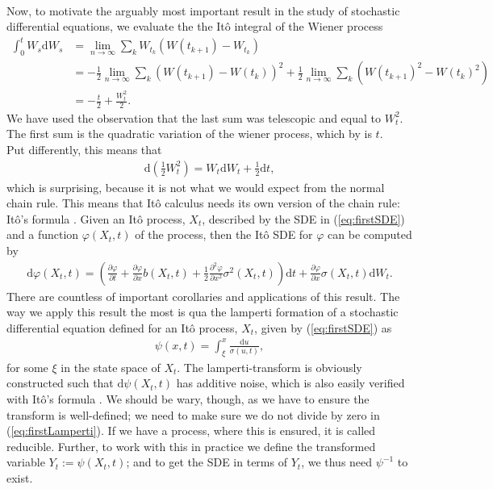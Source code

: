 \\
Now, to motivate the arguably most important result in the study of stochastic differential equations, we evaluate the the Itô integral of the Wiener process
\begin{align}
    \int_0^t W_s \mathrm{d}W_s & = \lim_{n \to \infty}\sum_k W_{t_k}\left(W(t_{k + 1}) - W_{t_k}\right) \nonumber \\ 
    & = - \frac{1}{2}\lim_{n \to \infty}\sum_k \left(W(t_{k + 1}) - W(t_{k})\right)^2  + \frac{1}{2}\lim_{n \to \infty}\sum_k\left(W(t_{k + 1})^2 - W(t_{k})^2\right) \nonumber \\
    & = -\frac{t}{2} + \frac{W_t^2}{2}.
\end{align}
We have used the observation that the last sum was telescopic and equal to $W_t^2$. The first sum is the quadratic variation of the wiener process, which by \cite[theorem 11.34]{Hansen2022} is $t$.\\ Put differently, this means that
\begin{align}
    \mathrm{d}\left(\frac{1}{2}W_t^2\right) = W_t\mathrm{d}W_t + \frac{1}{2}\mathrm{d}t,
\end{align}
which is surprising, because it is not what we would expect from the normal chain rule. This means that Itô calculus needs its own version of the chain rule: Itô's formula \cite[Theorem 4.2]{Srkk2019}.  Given an Itô process, $X_t$, described by the SDE in (\ref{eq:firstSDE}) and a function $\varphi(X_t, t)$ of the process, then the Itô SDE for $\varphi$ can be computed by
\begin{align}
    \mathrm{d}\varphi(X_t, t) = \left(\frac{\partial \varphi}{\partial t} + \frac{\partial\varphi}{\partial x}b(X_t, t) + \frac{1}{2} \frac{\partial^2 \varphi}{\partial x^2}\sigma^2(X_t, t) \right)\mathrm{d}t + \frac{\partial\varphi}{\partial x}\sigma(X_t, t) \mathrm{d}W_t.
\end{align}
There are countless of important corollaries and applications of this result. The way we apply this result the most is qua the lamperti formation of a stochastic differential equation defined for an Itô process, $X_t$, given by (\ref{eq:firstSDE}) as
\begin{align}
    \psi(x, t) = \int_{\xi}^x \frac{\mathrm{d}u}{\sigma(u, t)}, \label{eq:firstLamperti}
\end{align}
for some $\xi$ in the state space of $X_t$. The lamperti-transform is obviously constructed such that $\mathrm{d}\psi(X_t, t)$ has additive noise, which is also easily verified with Itô's formula \cite[equation (7.5)]{Srkk2019}. We should be wary, though, as we have to ensure the transform is well-defined; we need to make sure we do not divide by zero in (\ref{eq:firstLamperti}). If we have a process, where this is ensured, it is called reducible. Further, to work with this in practice we define the transformed variable $Y_t := \psi(X_t, t)$; and to get the SDE in terms of $Y_t$, we thus need $\psi^{-1}$ to exist.\\\\
